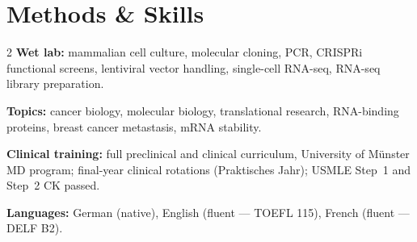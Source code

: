 \documentclass[letterpaper,11pt]{article}
\begin{document}
\section{Methods \& Skills}
\small
\begin{multicols}{2}
\noindent\textbf{Wet lab:} mammalian cell culture, molecular cloning, PCR, CRISPRi functional screens, lentiviral vector handling, single-cell RNA-seq, RNA-seq library preparation.

\vspace{4pt}
\noindent\textbf{Topics:} cancer biology, molecular biology, translational research, RNA-binding proteins, breast cancer metastasis, mRNA stability.

\columnbreak

\noindent\textbf{Clinical training:} full preclinical and clinical curriculum, University of Münster MD program; final-year clinical rotations (Praktisches Jahr); USMLE Step~1 and Step~2 CK passed.

\vspace{4pt}
\noindent\textbf{Languages:} German (native), English (fluent --- TOEFL 115), French (fluent --- DELF B2).
\end{multicols}
\normalsize
\end{document}
